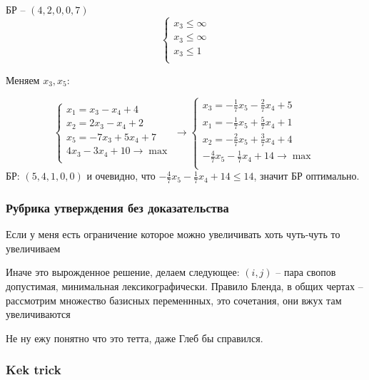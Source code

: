 БР -- $\left(4, 2, 0, 0, 7\right)$
\[\begin{cases}
    x_3 \leq \infty\\
    x_3 \leq \infty\\
    x_3 \leq 1\\
\end{cases}\]

Меняем $x_3, x_5$:

\[
    \begin{cases}
        x_1 = x_3 - x_4 + 4\\
        x_2 = 2x_3 - x_4 + 2\\
        x_5 = -7x_3 + 5x_4 + 7\\
        4x_3 - 3 x_4 + 10 \to \max\\
    \end{cases}\to
    \begin{cases}
        x_3 = -\frac17 x_5 - \frac27 x_4 + 5\\
        x_1 = -\frac17 x_5 + \frac57 x_4 + 1\\
        x_2 = -\frac27 x_5 + \frac37 x_4 + 4\\
        -\frac47 x_5 -\frac17 x_4 + 14 \to \max\\
    \end{cases}
\]
БР: $(5, 4, 1, 0, 0)$ и очевидно, что $-\frac47 x_5 -\frac17 x_4 + 14 \leq 14$, значит БР оптимально.

\subsubsection{Рубрика утверждения без доказательства}
Если у меня есть ограничение которое можно увеличивать хоть чуть-чуть то увеличиваем

Иначе это вырожденное решение, делаем следующее: $(i, j)$ -- пара свопов допустимая, минимальная лексикографически. 
Правило Бленда, в общих чертах -- рассмотрим множество базисных переменнных, это сочетания, они вжух там увеличиваются

Не ну ежу понятно что это тетта, даже Глеб бы справился.

\subsubsection{Kek trick}

